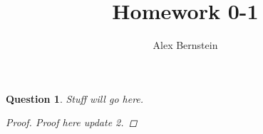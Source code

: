 \documentclass[10pt,letterpaper]{article}
\author{Alex Bernstein}
\title{Homework 0-1}
\newtheorem*{problems}{Question}
\begin{document}
\vspace*{1mm}
\begin{problems}
Stuff will go here.
\begin{proof}
Proof here update 2.
\end{proof}
\end{problems}
\end{document}
